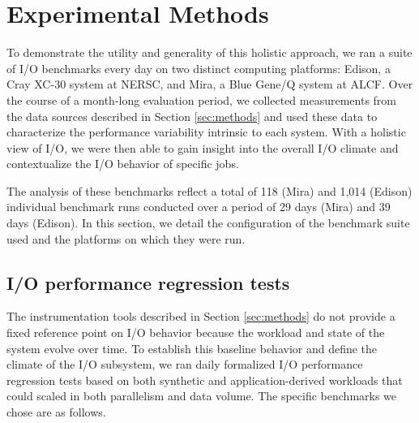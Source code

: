 \section{Experimental Methods} \label{sec:platforms}

To demonstrate the utility and generality of this holistic approach, we ran a suite of I/O benchmarks every day on two distinct computing platforms:
Edison, a Cray XC-30 system at NERSC, and Mira, a Blue Gene/Q system at ALCF.
Over the course of a month-long evaluation period, we collected measurements from the data sources described in Section \ref{sec:methods} and used these data to characterize the performance variability intrinsic to each system.
With a holistic view of I/O, we were then able to gain insight into the overall I/O climate and contextualize the I/O behavior of specific jobs.

The analysis of these benchmarks reflect a total of 118 (Mira) and 1,014 (Edison) individual benchmark runs conducted over a period of 29 days (Mira) and 39 days (Edison).
In this section, we detail the configuration of the benchmark suite used and the platforms on which they were run.

\subsection{I/O performance regression tests} \label{sec:methods/tests}

The instrumentation tools described in Section \ref{sec:methods} do not provide a fixed reference point on I/O behavior because
the workload and state of the system evolve over time.
To establish this baseline behavior and define the climate of the I/O subsystem, we ran daily formalized I/O performance regression tests based on 
both synthetic and application-derived workloads that could scaled in
both parallelism and data volume.
The specific benchmarks we chose are as follows.

